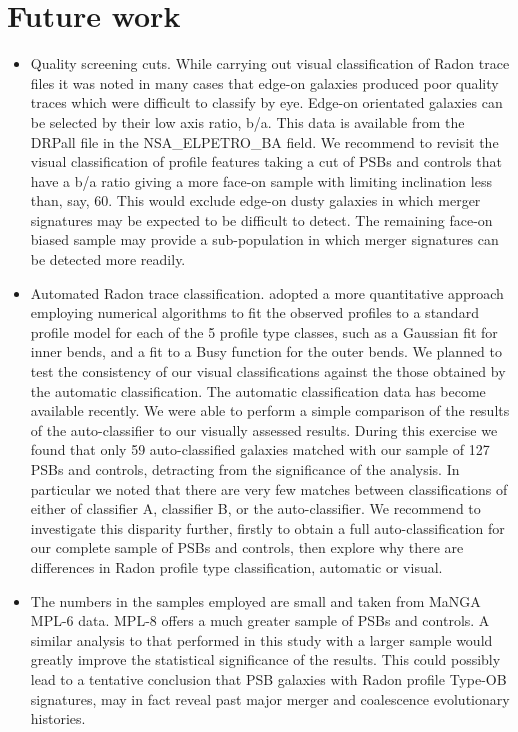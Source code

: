 \section{Future work}
\label{future-work}

\begin{itemize}
    \item Quality screening cuts. While carrying out visual classification of Radon trace files it was noted in many cases that edge-on galaxies produced poor quality traces which were difficult to classify by eye. Edge-on orientated galaxies can be selected by their low axis ratio, b/a. This data is available from the DRPall file in the NSA\_ELPETRO\_BA field. We recommend to revisit the visual classification of profile features taking a cut of PSBs and controls that have a b/a ratio giving a  more face-on sample with limiting inclination less than, say, 60\textdegree. This would exclude edge-on dusty galaxies in which merger signatures may be expected to be difficult to detect. The remaining face-on biased sample may provide a sub-population in which merger signatures can be detected more readily.
    \item Automated Radon trace classification. \cite{2018MNRAS.480.2217S} adopted a more quantitative approach employing numerical algorithms to fit the observed profiles to a standard profile model for each of the 5 profile type classes, such as a Gaussian fit for inner bends, and a fit to a Busy function \citep{2014ascl.soft02015W} for the outer bends. We planned to test the consistency of our visual classifications against the those obtained by the automatic classification. The automatic classification data has become available recently. We were able to perform a simple comparison of the results of the auto-classifier to our visually assessed results. During this exercise we found  that only 59 auto-classified galaxies matched with our sample of 127 PSBs and controls, detracting from the significance of the analysis. In particular we noted that there are very few matches between classifications of either of classifier A, classifier B, or the auto-classifier. We recommend to investigate this disparity further, firstly to obtain a full auto-classification for our complete sample of PSBs and controls, then explore why there are differences in Radon profile type classification, automatic or visual. 
    \item The numbers in the samples employed are small and taken from MaNGA MPL-6 data. MPL-8 offers a much greater sample of PSBs and controls. A similar analysis to that performed in this study with a larger sample would greatly improve the statistical significance of the results. This could possibly lead to a tentative conclusion that PSB galaxies with Radon profile Type-OB signatures, may in fact reveal past major merger and coalescence evolutionary histories.
\end{itemize}